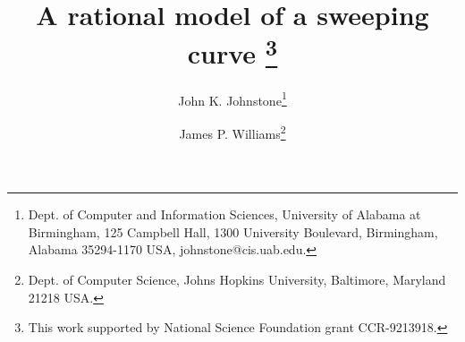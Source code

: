 \newcommand{\SingleSpace}{\edef\baselinestretch{0.9}\Large\normalsize}
\newcommand{\DoubleSpace}{\edef\baselinestretch{1.4}\Large\normalsize}
\newcommand{\Comment}[1]{\relax}  %
\newcommand{\Heading}[1]{\par\noindent{\bf#1}\nobreak}
\newcommand{\Tail}[1]{\nobreak\par\noindent{\bf#1}}
\newcommand{\QED}{\vrule height 1.4ex width 1.0ex depth -.1ex\ } %
\newcommand{\arc}[1]{\mbox{$\stackrel{\frown}{#1}$}}
\newcommand{\lyne}[1]{\mbox{$\stackrel{\leftrightarrow}{#1}$}}
\newcommand{\ray}[1]{\mbox{$\vec{#1}$}}          
\newcommand{\seg}[1]{\mbox{$\overline{#1}$}}
\newcommand{\tab}{\hspace*{.2in}}
\newcommand{\se}{\mbox{$_{\epsilon}$}}  %
\newcommand{\ie}{\mbox{i.e.}}
\newcommand{\eg}{\mbox{e.\ g.\ }}
\newcommand{\figg}[3]{\begin{figure}[htbp]\vspace{#3}\caption{#2}\label{#1}\end{figure}}
\newcommand{\be}{\begin{equation}}
\newcommand{\ee}{\end{equation}}
\newcommand{\prf}{\noindent{{\bf Proof} :\ }}
\newcommand{\choice}[2]{\left( \begin{array}{c} \mbox{\footnotesize{#1}} \\ \mbox{\footnotesize{#2}} \end{array} \right)}      
\newcommand{\ddt}{\frac{\partial}{\partial t}}

\newtheorem{rmk}{Remark}[section]
\newtheorem{example}{Example}[section]
\newtheorem{conjecture}{Conjecture}[section]
\newtheorem{claim}{Claim}[section]
\newtheorem{notation}{Notation}[section]
\newtheorem{lemma}{Lemma}[section]
\newtheorem{theorem}{Theorem}[section]
\newtheorem{corollary}{Corollary}[section]
\newtheorem{defn2}{Definition}

\ifFull                                          
\SingleSpace
\else
\DoubleSpace
\fi

\setlength{\oddsidemargin}{0pt}
\setlength{\evensidemargin}{0pt}
\setlength{\headsep}{0pt}
\setlength{\topmargin}{0pt}
\setlength{\textheight}{8.75in}
\setlength{\textwidth}{6.5in}
\setlength{\headsep}{.2in}

\title{
A rational model of a sweeping curve
        \thanks{This work supported by National Science Foundation grant
        CCR-9213918.}}
\author{John K. Johnstone\thanks{Dept. of Computer and Information 
	Sciences,
	University of Alabama at Birmingham,
	125 Campbell Hall, 1300 University Boulevard,
	Birmingham, Alabama  35294-1170 USA, johnstone@cis.uab.edu.}
 	\and James P. Williams\thanks{Dept. of Computer Science,
 	Johns Hopkins University, Baltimore, Maryland 21218 USA.}}


